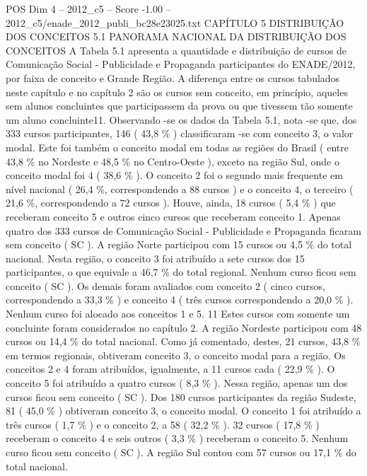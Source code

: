 \begin{textsample}{POS Dim 4 – 2012\_c5 – Score -1.00 – 2012\_c5/enade\_2012\_publi\_bc28e23025.txt}  \label{ex:f4_pos_256}
CAPÍTULO 5 DISTRIBUIÇÃO DOS CONCEITOS 5.1 PANORAMA NACIONAL DA DISTRIBUIÇÃO DOS CONCEITOS A Tabela 5.1 apresenta a quantidade e distribuição de cursos de Comunicação Social - Publicidade e Propaganda participantes do ENADE/2012, por faixa de conceito e Grande Região.
A diferença entre os cursos tabulados neste capítulo e no capítulo 2 são os cursos sem conceito, em princípio, aqueles sem alunos concluintes que participassem da prova ou que tivessem tão somente um aluno concluinte11.
Observando -se os dados da Tabela 5.1, nota -se que, dos 333 cursos participantes, 146 ( 43,8 \% ) classificaram -se com conceito 3, o valor modal.
Este foi também o conceito modal em todas as regiões do Brasil ( entre 43,8 \% no Nordeste e 48,5 \% no Centro-Oeste ), exceto na região Sul, onde o conceito modal foi 4 ( 38,6 \% ).
O conceito 2 foi o segundo mais frequente em nível nacional ( 26,4 \%, correspondendo a 88 cursos ) e o conceito 4, o terceiro ( 21,6 \%, correspondendo a 72 cursos ).
Houve, ainda, 18 cursos ( 5,4 \% ) que receberam conceito 5 e outros cinco cursos que receberam conceito 1.
Apenas quatro dos 333 cursos de Comunicação Social - Publicidade e Propaganda ficaram sem conceito ( SC ).
A região Norte participou com 15 cursos ou 4,5 \% do total nacional.
Nesta região, o conceito 3 foi atribuído a sete cursos dos 15 participantes, o que equivale a 46,7 \% do total regional.
Nenhum curso ficou sem conceito ( SC ).
Os demais foram avaliados com conceito 2 ( cinco cursos, correspondendo a 33,3 \% ) e conceito 4 ( três cursos correspondendo a 20,0 \% ).
Nenhum curso foi alocado aos conceitos 1 e 5. 11 Estes cursos com somente um concluinte foram considerados no capítulo 2.
A região Nordeste participou com 48 cursos ou 14,4 \% do total nacional.
Como já comentado, destes, 21 cursos, 43,8 \% em termos regionais, obtiveram conceito 3, o conceito modal para a região.
Os conceitos 2 e 4 foram atribuídos, igualmente, a 11 cursos cada ( 22,9 \% ).
O conceito 5 foi atribuído a quatro cursos ( 8,3 \% ).
Nessa região, apenas um dos cursos ficou sem conceito ( SC ).
Dos 180 cursos participantes da região Sudeste, 81 ( 45,0 \% ) obtiveram conceito 3, o conceito modal.
O conceito 1 foi atribuído a três cursos ( 1,7 \% ) e o conceito 2, a 58 ( 32,2 \% ). 32 cursos ( 17,8 \% ) receberam o conceito 4 e seis outros ( 3,3 \% ) receberam o conceito 5.
Nenhum curso ficou sem conceito ( SC ).
A região Sul contou com 57 cursos ou 17,1 \% do total nacional.

\end{textsample}

